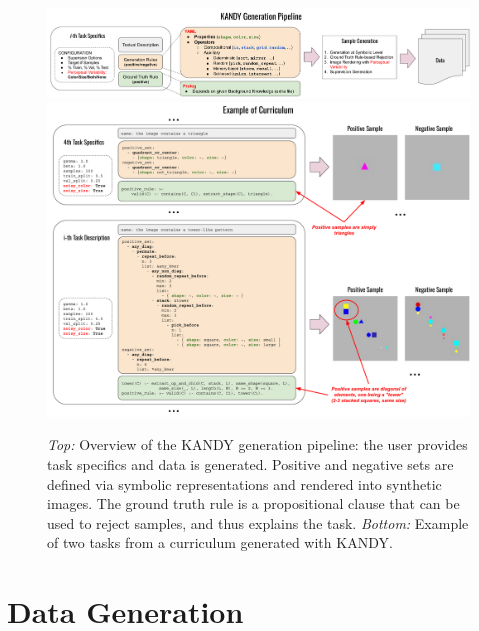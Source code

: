 \begin{figure}
\centering
\includegraphics[width=1.0\textwidth]{imgs/kandy/Fig1a.pdf}
\vskip 4mm
\includegraphics[width=\textwidth]{imgs/kandy/Fig1b.pdf}
\caption[KANDY generation pipeline]{\textit{Top:} Overview of the KANDY generation pipeline: the user provides task specifics and data is generated. Positive and negative sets are defined via symbolic representations and rendered into synthetic images. The ground truth rule is a propositional clause that can be used to reject samples, and thus explains the task. \textit{Bottom:} Example of two tasks from a curriculum generated with KANDY. \label{kandy:fig:example-kandy}}
\end{figure}

\section{Data Generation}\label{kandy:sec:generation}

